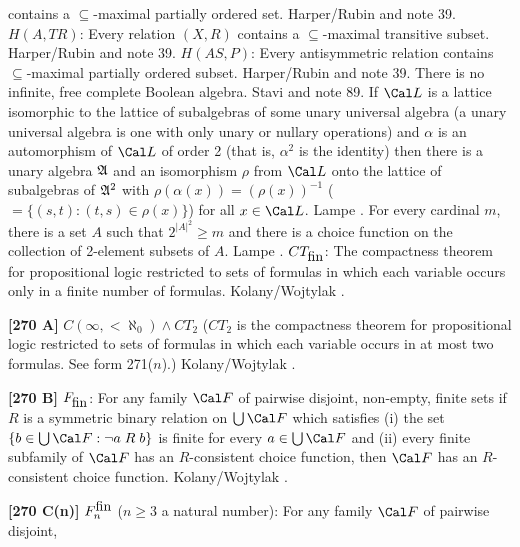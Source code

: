 contains a $\subseteq$-maximal partially ordered set. \ac{Harper/Rubin}
\cite{1976} and note 39.
\medskip
{} $H(A,TR)$: Every relation $(X,R)$ contains a
$\subseteq$-maximal transitive subset.  \ac{Harper/Rubin} \cite{1976}
and note 39.
\medskip
{} $H(AS,P)$: Every antisymmetric relation contains
$\subseteq$-maximal partially ordered subset. \ac{Harper/Rubin} \cite{1976}
and note 39.
\medskip
{} There is no infinite, free complete Boolean
algebra.  \ac{Stavi} \cite{1975} and note 89.
\medskip
{}   If ${\Cal L}$  is  a  lattice  isomorphic  to
the  lattice  of subalgebras of some unary universal algebra (a unary
universal algebra is one with only unary or nullary operations) and
$\alpha $ is an automorphism of ${\Cal L}$ of order 2 (that is, $\alpha
^{2}$  is  the  identity) then there is a unary algebra $\frak A$  and an
isomorphism $\rho $  from ${\Cal L}$ onto the lattice of subalgebras
of $\frak A^{2}$ with $\rho(\alpha(x))=(\rho(x))^{-1}$ ($= \{(s,t) :
(t,s)\in\rho(x)\}$) for all $x\in  {\Cal L}$. \ac{Lampe} \cite{1974}.
\medskip
{} For every cardinal $m$, there is a set $A$ such
that $2^{|A|^2}\ge m$ and there is a choice function on the collection
of 2-element subsets of $A$.  \ac{Lampe} \cite{1974}.
\medskip
{} $CT_{\hbox{fin}}$: The compactness theorem for
propositional logic restricted to sets of formulas in which each
variable occurs only in a finite number of formulas. \ac{Kolany/Wojtylak}
\cite{1991}.
\smallskip
\item{}{\bf [270 A]}  $C(\infty,<\aleph_{0})\wedge CT_{2}$ ($CT_{2}$
is the compactness theorem for propositional logic restricted to sets of
formulas in which each variable occurs in at most two formulas.
See form 271($n$).)  \ac{Kolany/Wojtylak} \cite{1991}.
\smallskip
\item{}{\bf [270 B]} $F_{\hbox{fin}}$:  For any family ${\Cal F}$  of
pairwise disjoint, non-empty, finite sets if $R$ is a symmetric binary
relation on $\bigcup {\Cal F}$ which satisfies (i) the set $\{b\in\bigcup
{\Cal F}: \neg a\mathrel R b\}$ is finite for every $a\in\bigcup{\Cal F}$
and (ii) every finite subfamily of ${\Cal F}$ has an $R$-consistent
choice function, then ${\Cal F}$ has an $R$-consistent
choice function.  \ac{Kolany/Wojtylak} \cite{1991}.
\smallskip
\item{}{\bf [270 C(n)]}  $F^{\hbox{fin}}_n$ ($n\ge 3$ a natural number):
For any family ${\Cal F}$ of pairwise disjoint,
